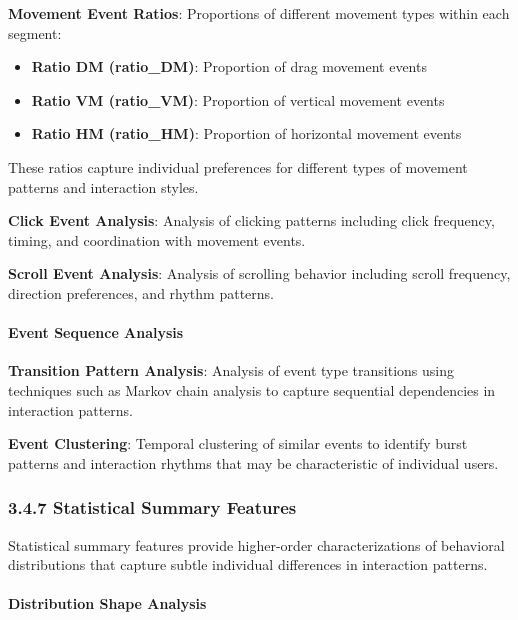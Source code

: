 \documentclass[
  11pt,
  a4paper,
]{article}
\providecommand{\tightlist}{%
  \setlength{\itemsep}{0pt}\setlength{\parskip}{0pt}}
\begin{document}
\textbf{Movement Event Ratios}: Proportions of different movement types
within each segment:

\begin{itemize}
\tightlist
\item
  \textbf{Ratio DM (ratio\_DM)}: Proportion of drag movement events
\item
  \textbf{Ratio VM (ratio\_VM)}: Proportion of vertical movement events
\item
  \textbf{Ratio HM (ratio\_HM)}: Proportion of horizontal movement
  events
\end{itemize}

These ratios capture individual preferences for different types of
movement patterns and interaction styles.

\textbf{Click Event Analysis}: Analysis of clicking patterns including
click frequency, timing, and coordination with movement events.

\textbf{Scroll Event Analysis}: Analysis of scrolling behavior including
scroll frequency, direction preferences, and rhythm patterns.

\paragraph{Event Sequence Analysis}\label{event-sequence-analysis}

\textbf{Transition Pattern Analysis}: Analysis of event type transitions
using techniques such as Markov chain analysis to capture sequential
dependencies in interaction patterns.

\textbf{Event Clustering}: Temporal clustering of similar events to
identify burst patterns and interaction rhythms that may be
characteristic of individual users.

\subsubsection{3.4.7 Statistical Summary
Features}\label{statistical-summary-features}

Statistical summary features provide higher-order characterizations of
behavioral distributions that capture subtle individual differences in
interaction patterns.

\paragraph{Distribution Shape
Analysis}\label{distribution-shape-analysis}
\end{document}
